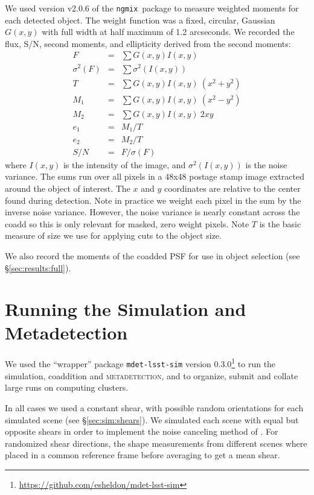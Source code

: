 \documentclass[iop, twocolappendix, appendixfloats, numberedappendix, apj]{hackemulateapj}
\newcommand{\ngmix}{\texttt{ngmix}}
\newcommand{\mdet}{\textsc{metadetection}}
\begin{document}
We used version v2.0.6 of the \ngmix\ package to measure weighted moments for
each detected object. The weight function was a fixed, circular, Gaussian $G(x,
y)$ with full width at half maximum of 1.2 arcseconds.  We recorded the flux,
S/N, second moments, and ellipticity derived from the second moments:
\begin{eqnarray} \label{eq:moments}
    F &=& \sum G(x, y) I(x, y) \\
    \sigma^2(F) &=& \sum \sigma^2(I(x, y)) \\
    T &=& \sum G(x, y) I(x, y) ~ (x^2 + y^2) \\
    M_1 &=& \sum G(x, y) I(x, y) ~ (x^2 - y^2) \\
    M_2 &=& \sum G(x, y) I(x, y) ~ 2 x y \\
    e_1 &=& M_1 / T \\
    e_2 &=& M_2 / T \\
    S/N &=& F / \sigma(F)
\end{eqnarray}
where $I(x, y)$ is the intensity of the image, and $\sigma^2(I(x, y))$ is the
noise variance. The sums run over all pixels in a 48x48 postage stamp image
extracted around the object of interest.  The $x$ and $y$ coordinates are
relative to the center found during detection.  Note in practice we weight each
pixel in the sum by the inverse noise variance. However, the noise variance is
nearly constant across the coadd so this is only relevant for masked, zero
weight pixels.  Note $T$ is the basic measure of size we use for applying
cuts to the object size.

We also record the moments of the coadded PSF for use in object selection (see
\S \ref{sec:results:full}).


\section{Running the Simulation and Metadetection} \label{sec:running}

We used the ``wrapper'' package \texttt{mdet-lsst-sim} version
0.3.0\footnote{\url{https://github.com/esheldon/mdet-lsst-sim}} to run the
simulation, coaddition and \mdet, and to organize, submit and collate large
runs on computing clusters.

In all cases we used a constant shear, with possible random orientations for
each simulated scene (see \S \ref{sec:sim:shears}).  We simulated each scene
with equal but opposite shears in order to implement the noise canceling method
of \citep{pujol2019}.  For randomized shear directions, the shape measurements
from different scenes where placed in a common reference frame before averaging
to get a mean shear.
\end{document}
